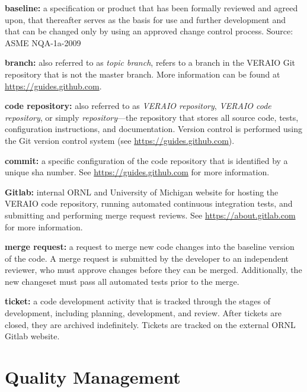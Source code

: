 \documentclass{vera-ornltm}
\begin{document}
\begin{description}
\item{\textbf{baseline:} a specification or product that has been formally reviewed and agreed upon, that thereafter serves as the basis for use and further development and that can be changed only by using an approved change control process. Source: ASME NQA-1a-2009}
\item{\textbf{branch:} also referred to as \textit{topic branch}, refers to a branch in the VERAIO Git repository that is not the master branch. More information can be found at \url{https://guides.github.com}.}
\item{\textbf{code repository:} also referred to as \textit{VERAIO repository}, \textit{VERAIO code repository}, or simply \textit{repository}---the repository that stores all source code, tests, configuration instructions, and documentation.  Version control is performed using the Git version control system (see \url{https://guides.github.com}).}
\item{\textbf{commit:} a specific configuration of the code repository that is identified by a unique \ac{sha} number.  See \url{https://guides.github.com} for more information.}
\item{\textbf{Gitlab:} internal ORNL and University of Michigan website for hosting the VERAIO code repository, running automated continuous integration tests, and submitting and performing merge request reviews. See \url{https://about.gitlab.com} for more information.}
\item{\textbf{merge request:} a request to merge new code changes into the baseline version of the code.  A merge request is submitted by the developer to an independent reviewer, who must approve changes before they can be merged.  Additionally, the new changeset must pass all automated tests prior to the merge.}
\item{\textbf{ticket:} a code development activity that is tracked through the stages of development, including planning, development, and review. After tickets are closed, they are archived indefinitely. Tickets are tracked on the external ORNL Gitlab website.}
\end{description}


\section{Quality Management}
\end{document}
